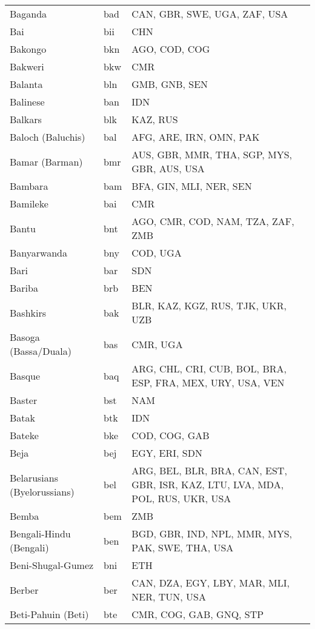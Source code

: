 \documentclass[12pt]{article}
\begin{document}
\begin{center}
\begin{longtable}{|p{7cm}|p{1cm}|p{7cm}|}
Baganda	&	bad 	&	CAN, GBR, SWE, UGA, ZAF, USA	\\	\cline{1-3}
Bai	&	bii	&	CHN	\\	\cline{1-3}
Bakongo	&	bkn	&	AGO, COD, COG	\\	\cline{1-3}
Bakweri	&	bkw	&	CMR	\\	\cline{1-3}
Balanta	&	bln	&	GMB, GNB, SEN	\\	\cline{1-3}
Balinese	&	ban 	&	IDN	\\	\cline{1-3}
Balkars	&	blk	&	KAZ, RUS	\\	\cline{1-3}
Baloch (Baluchis)	&	bal 	&	AFG, ARE, IRN, OMN, PAK	\\	\cline{1-3}
Bamar (Barman)	&	bmr	&	AUS, GBR, MMR, THA, SGP, MYS, GBR, AUS, USA	\\	\cline{1-3}
Bambara	&	bam 	&	BFA, GIN, MLI, NER, SEN	\\	\cline{1-3}
Bamileke	&	bai 	&	CMR	\\	\cline{1-3}
Bantu	&	bnt 	&	AGO, CMR, COD, NAM, TZA, ZAF, ZMB	\\	\cline{1-3}
Banyarwanda	&	bny	&	COD, UGA	\\	\cline{1-3}
Bari	&	bar	&	SDN	\\	\cline{1-3}
Bariba	&	brb	&	BEN	\\	\cline{1-3}
Bashkirs	&	bak 	&	BLR, KAZ, KGZ, RUS, TJK, UKR, UZB	\\	\cline{1-3}
Basoga (Bassa/Duala)	&	bas 	&	CMR, UGA	\\	\cline{1-3}
Basque	&	baq	&	ARG, CHL, CRI, CUB, BOL, BRA, ESP, FRA, MEX, URY, USA, VEN	\\	\cline{1-3}
Baster	&	bst	&	NAM	\\	\cline{1-3}
Batak	&	btk 	&	IDN	\\	\cline{1-3}
Bateke	&	bke	&	COD, COG, GAB	\\	\cline{1-3}
Beja	&	bej 	&	EGY, ERI, SDN	\\	\cline{1-3}
Belarusians (Byelorussians)	&	bel 	&	ARG, BEL, BLR, BRA, CAN, EST, GBR, ISR, KAZ, LTU, LVA, MDA, POL, RUS, UKR, USA	\\	\cline{1-3}
Bemba	&	bem 	&	ZMB	\\	\cline{1-3}
Bengali-Hindu (Bengali)	&	ben 	&	BGD, GBR, IND, NPL, MMR, MYS, PAK, SWE, THA, USA	\\	\cline{1-3}
Beni-Shugal-Gumez	&	bni	&	ETH	\\	\cline{1-3}
Berber	&	ber 	&	CAN, DZA, EGY, LBY, MAR, MLI, NER, TUN, USA	\\	\cline{1-3}
Beti-Pahuin (Beti)	&	bte	&	CMR, COG, GAB, GNQ, STP	\\	\cline{1-3}

\end{longtable}
\end{center}
\end{document}
